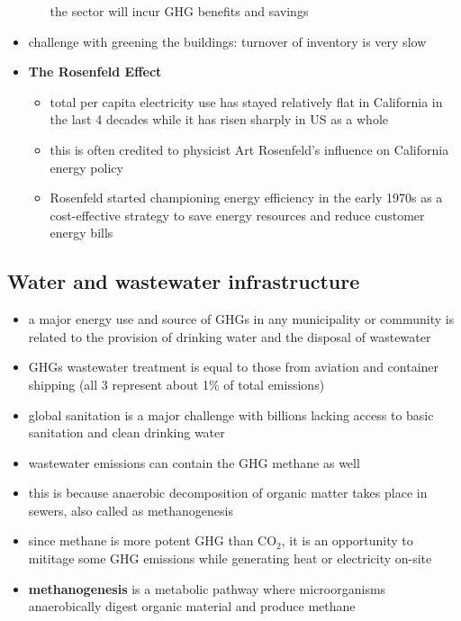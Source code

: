 \begin{itemize}
\begin{itemize}
		the sector will incur GHG benefits and savings
	\end{itemize}
	\item challenge with greening the buildings: turnover of inventory is
	very slow
	\item \textbf{The Rosenfeld Effect}
	\begin{itemize}
		\item total per capita electricity use has stayed relatively
		flat in California in the last 4 decades while it has risen
		sharply in US as a whole
		\item this is often credited to physicist Art Rosenfeld's
		influence on California energy policy
		\item Rosenfeld started championing energy efficiency in the
		early 1970s as a cost-effective strategy to save energy
		resources and reduce customer energy bills
	\end{itemize}
\end{itemize}

\subsection{Water and wastewater infrastructure}
\begin{itemize}
	\item a major energy use and source of GHGs in any municipality or
	community is related to the provision of drinking water and the
	disposal of wastewater
	\item GHGs wastewater treatment is equal to those from aviation and
	container shipping (all 3 represent about 1\% of total emissions)
	\item global sanitation is a major challenge with billions lacking
	access to basic sanitation and clean drinking water
	\item wastewater emissions can contain the GHG methane as well
	\item this is because anaerobic decomposition of organic matter takes
	place in sewers, also called as methanogenesis
	\item since methane is more potent GHG than CO$_2$, it is an
	opportunity to mititage some GHG emissions while generating heat or
	electricity on-site
	\item \textbf{methanogenesis} is a metabolic pathway where
	microorganisms anaerobically digest organic material and produce
	methane
\end{itemize}

